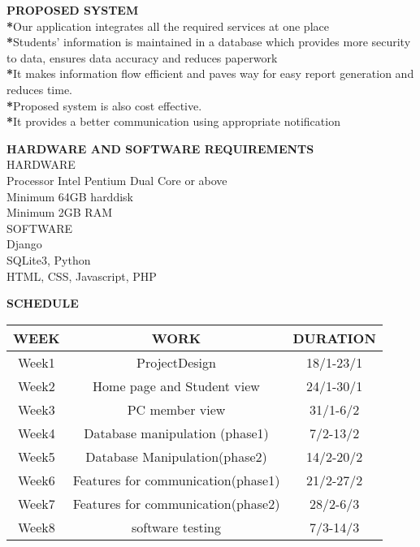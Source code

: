 \documentclass{beamer}
\begin{document}
\begin{frame}
\begin{flushleft}
\Large{\textbf{PROPOSED SYSTEM} }\\[20pt]
\normalsize{\textbf{*}Our application integrates all the required services at one place}\\
\normalsize{\textbf{*}Students’ information is maintained in a database which provides more security to data, ensures data accuracy and reduces paperwork }\\
\normalsize{\textbf{*}It makes information flow efficient and paves way for easy report generation and reduces time.}\\
\normalsize{\textbf{*}Proposed system is also cost effective.}\\
\normalsize{\textbf{*}It provides a better communication using appropriate notification}
\end{flushleft}
\end{frame}
\begin{frame}
\begin{flushleft}
\Large{\textbf{HARDWARE AND SOFTWARE REQUIREMENTS}}\\[20pt]
\large{HARDWARE}\\[10pt]
	Processor Intel Pentium Dual Core or above\\
	Minimum 64GB harddisk\\
	Minimum 2GB RAM\\[20pt]
\large{SOFTWARE}\\[10pt]
Django\\SQLite3, Python\\HTML, CSS, Javascript, PHP	
\end{flushleft}
\end{frame}
\begin{frame}
\begin{flushleft}
\Large{\textbf{SCHEDULE}} \\[40pt]
\begin{center}
 \small{\begin{tabular}{||c c  c ||} 
 \hline
 WEEK & WORK & DURATION   \\ [0.5ex] 
 \hline\hline
 Week1 & ProjectDesign & 18/1-23/1 \\
 \hline
 Week2 & Home page and Student view&24/1-30/1 \\
 \hline
 Week3 & PC member view  &31/1-6/2   \\
 \hline
 Week4 & Database manipulation (phase1) &7/2-13/2   \\
 \hline
  Week5 & Database Manipulation(phase2) & 14/2-20/2   \\
  \hline
   Week6 & Features for communication(phase1) &21/2-27/2   \\
   \hline
    Week7 & Features for communication(phase2) & 28/2-6/3   \\
    \hline
 Week8 & software testing &7/3-14/3   \\ [1ex] 
 \hline
\end{tabular}}
\end{center}

\end{flushleft}
\end{frame}
\end{document}
